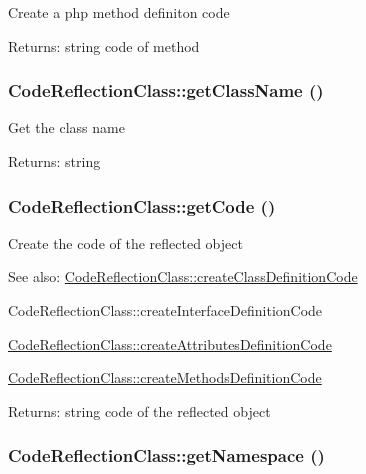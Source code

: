 Create a php method definiton code

\begin{Desc}
\item[Returns:]string code of method \end{Desc}
\hypertarget{class_code_reflection_class_301551243100b6815a25631e0a51bbbd}{
\subsubsection[{getClassName}]{\setlength{\rightskip}{0pt plus 5cm}CodeReflectionClass::getClassName ()}}
\label{class_code_reflection_class_301551243100b6815a25631e0a51bbbd}


Get the class name

\begin{Desc}
\item[Returns:]string \end{Desc}
\hypertarget{class_code_reflection_class_7a387d50344d14a25fbccf5e653f9312}{
\subsubsection[{getCode}]{\setlength{\rightskip}{0pt plus 5cm}CodeReflectionClass::getCode ()}}
\label{class_code_reflection_class_7a387d50344d14a25fbccf5e653f9312}


Create the code of the reflected object

\begin{Desc}
\item[See also:]\hyperlink{class_code_reflection_class_a7ab3478fc4d4d35708852357cfaddc7}{CodeReflectionClass::createClassDefinitionCode} 

CodeReflectionClass::createInterfaceDefinitionCode 

\hyperlink{class_code_reflection_class_4bf8009246a6e2c63ff61c6c2098fbf9}{CodeReflectionClass::createAttributesDefinitionCode} 

\hyperlink{class_code_reflection_class_d5281e9b818a323b080cbc8fa9a07365}{CodeReflectionClass::createMethodsDefinitionCode} \end{Desc}
\begin{Desc}
\item[Returns:]string code of the reflected object \end{Desc}
\hypertarget{class_code_reflection_class_b06f3f9c77e5de60c88b6afe05fc7ce3}{
\subsubsection[{getNamespace}]{\setlength{\rightskip}{0pt plus 5cm}CodeReflectionClass::getNamespace ()}}
\label{class_code_reflection_class_b06f3f9c77e5de60c88b6afe05fc7ce3}


